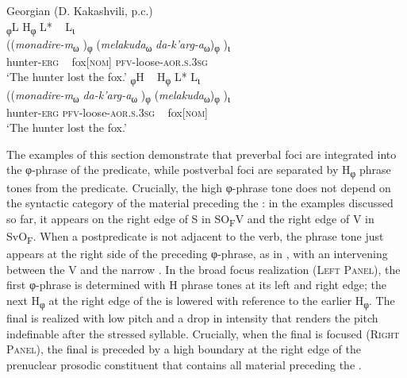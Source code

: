 \documentclass[output=paper,colorlinks,citecolor=brown]{langscibook}
\begin{document}
\newpage


\begin{samepage}
\ea \label{ex:georgianNarrow}
    Georgian (D. Kakashvili, p.c.)\\
    \ea 
        \glll \textup{\textsubscript{φ}L} \textup{H\textsubscript{φ}} \hspace{0.4cm}\textup{L*} ~ \textup{L\textsubscript{ι}} \\
            ((\textit{monadire-m}\textsubscript{ω} )\textsubscript{φ} (\textit{melakuda}\textsubscript{ω} \textit{da-k’arg-a}\textsubscript{ω})\textsubscript{φ} )\textsubscript{ι}\\
            hunter-\textsc{erg} ~ fox\textsc{[nom]} \textsc{pfv-}loose-\textsc{aor.s.3sg}\\
            \glt ‘The hunter lost the fox.’
    \ex 
        \glll \textup{\textsubscript{φ}H} ~ \textup{H\textsubscript{φ}} \hspace{0.4cm}\textup{L*} \textup{L\textsubscript{ι}} \\
            ((\textit{monadire-m}\textsubscript{ω} \textit{da-k’arg-a}\textsubscript{ω} )\textsubscript{φ} (\textit{melakuda}\textsubscript{ω})\textsubscript{φ}  )\textsubscript{ι}\\
            hunter-\textsc{erg} \textsc{pfv-}loose-\textsc{aor.s.3sg} ~ fox\textsc{[nom]}\\
            \glt ‘The hunter lost the fox.’
    \z
\z
\end{samepage}

The examples of this section demonstrate that preverbal foci are integrated into the φ-phrase of the predicate, while postverbal foci are separated by H\textsubscript{φ} phrase tones from the predicate. Crucially, the high φ-phrase tone does not depend on the syntactic category of the material preceding the : in the examples discussed so far, it appears on the right edge of S in SO\textsubscript{F}V and the right edge of V in SvO\textsubscript{F}. When a postpredicate  is not adjacent to the verb, the phrase tone just appears at the right side of the preceding φ-phrase, as in , with an  intervening between the V and the narrow . In the broad focus realization (\textsc{Left Panel}), the first φ-phrase is determined with H phrase tones at its left and right edge; the next H\textsubscript{φ} at the right edge of the  is lowered with reference to the earlier H\textsubscript{φ}. The final  is realized with low pitch and a drop in intensity that renders the pitch indefinable after the stressed syllable. Crucially, when the final  is focused (\textsc{Right Panel}), the final  is preceded by a high boundary at the right edge of the prenuclear prosodic constituent that contains all material preceding the .
\end{document}
